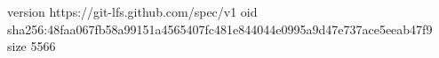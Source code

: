 version https://git-lfs.github.com/spec/v1
oid sha256:48faa067fb58a99151a4565407fc481e844044e0995a9d47e737ace5eeab47f9
size 5566
